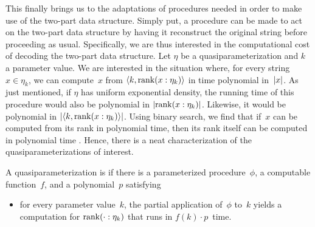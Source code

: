 This finally brings us to the adaptations of procedures needed in order to make use of the two-part data structure.
Simply put, a procedure can be made to act on the two-part data structure by having it reconstruct the original string before proceeding as usual.
Specifically, we are thus interested in the computational cost of decoding the two-part data structure.
Let $\eta$ be a quasiparameterization and $k$ a parameter value.
We are interested in the situation where, for every string~$x \in \eta_k$, we can compute~$x$ from ${\langle k, \operatorname{rank}(x : \eta_k)\rangle}$ in time polynomial in~${\lvert x\rvert}$.
As just mentioned, if $\eta$ has uniform exponential density, the running time of this procedure would also be polynomial in ${\lvert\operatorname{rank}(x : \eta_k)\rvert}$.
Likewise, it would be polynomial in ${\lvert{\langle k, \operatorname{rank}(x : \eta_k)\rangle}\rvert}$.
Using binary search, we find that if~$x$ can be computed from its rank in polynomial time, then its rank itself can be computed in polynomial time \parencite[Theorem~6.1]{hemachandra1990complexity}.
Hence, there is a neat characterization of the quasiparameterizations of interest.
\begin{definition}
  A quasiparameterization is  if there is a parameterized procedure~$\phi$, a computable function~$f$, and a polynomial~$p$ satisfying
  \begin{itemize}
  \item for every parameter value~$k$, the partial application of~$\phi$ to~$k$ yields a computation for $\operatorname{rank}(\cdot : \eta_k)$ that runs in $f(k) \cdot p$~time.
  \end{itemize}
\end{definition}

